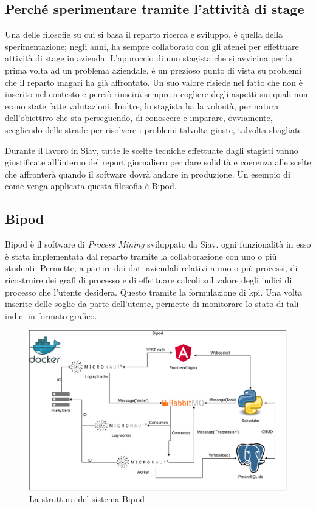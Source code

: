 \subsection{Perché sperimentare tramite l'attività di stage}
\label{ssec:sperimentareStage}
Una delle filosofie su cui si basa il reparto ricerca e sviluppo, è quella della sperimentazione; negli anni, ha sempre collaborato con gli atenei per effettuare attività di stage in azienda. L'approccio di uno stagista che si avvicina per la prima volta ad un problema aziendale, è un prezioso punto di vista su problemi che il reparto magari ha già affrontato. Un suo valore risiede nel fatto che non è inserito nel contesto e perciò riuscirà sempre a cogliere degli aspetti sui quali non erano state fatte valutazioni. Inoltre, lo stagista ha la volontà, per natura dell'obiettivo che sta perseguendo, di conoscere e imparare, ovviamente, scegliendo delle strade per risolvere i problemi talvolta giuste, talvolta sbagliate.

Durante il lavoro in Siav, tutte le scelte tecniche effettuate dagli stagisti vanno giustificate all'interno del report giornaliero per dare solidità e coerenza alle scelte che affronterà quando il software dovrà andare in produzione. Un esempio di come venga applicata questa filosofia è Bipod.
\subsection{Bipod}
Bipod è il software di \textit{Process Mining} sviluppato da Siav. ogni funzionalità in esso è stata implementata dal reparto tramite la collaborazione con uno o più studenti. Permette, a partire dai dati aziendali relativi a uno o più processi, di ricostruire dei grafi di processo e di effettuare calcoli sul valore degli indici di processo che l'utente desidera. Questo tramite la formulazione di \acrshort{kpi}\glsfirstoccur. Una volta inserite delle soglie da parte dell'utente, permette di monitorare lo stato di tali indici in formato grafico.
\begin{figure}[H]
    \centering
    \includegraphics[width=\columnwidth]{immagini/Bipod docker scheme.png}
    \caption{La struttura del sistema Bipod}
    \label{fig:bipodMessages}
\end{figure}

